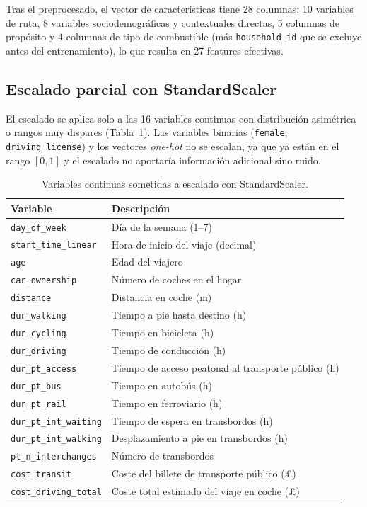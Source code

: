 Tras el preprocesado, el vector de características tiene 28 columnas: 10 variables de ruta, 8 variables sociodemográficas y contextuales directas, 5 columnas de propósito y 4 columnas de tipo de combustible (más \texttt{household\_id} que se excluye antes del entrenamiento), lo que resulta en 27 features efectivas.

\subsection{Escalado parcial con StandardScaler}

El escalado se aplica solo a las 16 variables continuas con distribución asimétrica o rangos muy dispares (Tabla~\ref{tab:scaled_features}). Las variables binarias (\texttt{female}, \texttt{driving\_license}) y los vectores \textit{one-hot} no se escalan, ya que ya están en el rango $[0, 1]$ y el escalado no aportaría información adicional sino ruido.

\begin{table}[htbp]
  \caption{Variables continuas sometidas a escalado con StandardScaler.}
  \label{tab:scaled_features}
  \centering
  \begin{tabular}{ll}
    \toprule
    \textbf{Variable} & \textbf{Descripción} \\
    \midrule
    \texttt{day\_of\_week}           & Día de la semana (1--7) \\
    \texttt{start\_time\_linear}     & Hora de inicio del viaje (decimal) \\
    \texttt{age}                     & Edad del viajero \\
    \texttt{car\_ownership}          & Número de coches en el hogar \\
    \texttt{distance}                & Distancia en coche (m) \\
    \texttt{dur\_walking}            & Tiempo a pie hasta destino (h) \\
    \texttt{dur\_cycling}            & Tiempo en bicicleta (h) \\
    \texttt{dur\_driving}            & Tiempo de conducción (h) \\
    \texttt{dur\_pt\_access}         & Tiempo de acceso peatonal al transporte público (h) \\
    \texttt{dur\_pt\_bus}            & Tiempo en autobús (h) \\
    \texttt{dur\_pt\_rail}           & Tiempo en ferroviario (h) \\
    \texttt{dur\_pt\_int\_waiting}   & Tiempo de espera en transbordos (h) \\
    \texttt{dur\_pt\_int\_walking}   & Desplazamiento a pie en transbordos (h) \\
    \texttt{pt\_n\_interchanges}     & Número de transbordos \\
    \texttt{cost\_transit}           & Coste del billete de transporte público (£) \\
    \texttt{cost\_driving\_total}    & Coste total estimado del viaje en coche (£) \\
    \bottomrule
  \end{tabular}
\end{table}

